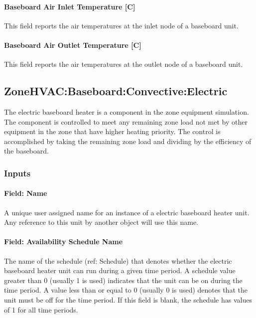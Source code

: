 \paragraph{Baseboard Air Inlet Temperature {[}C{]}}\label{baseboard-air-inlet-temperature-c-1}

This field reports the air temperatures at the inlet node of a baseboard unit.

\paragraph{Baseboard Air Outlet Temperature {[}C{]}}\label{baseboard-air-outlet-temperature-c-1}

This field reports the air temperatures at the outlet node of a baseboard unit.

\subsection{ZoneHVAC:Baseboard:Convective:Electric}\label{zonehvacbaseboardconvectiveelectric}

The electric baseboard heater is a component in the zone equipment simulation. The component is controlled to meet any remaining zone load not met by other equipment in the zone that have higher heating priority. The control is accomplished by taking the remaining zone load and dividing by the efficiency of the baseboard.

\subsubsection{Inputs}\label{inputs-4-025}

\paragraph{Field: Name}\label{field-name-4-022}

A unique user assigned name for an instance of a electric baseboard heater unit. Any reference to this unit by another object will use this name.

\paragraph{Field: Availability Schedule Name}\label{field-availability-schedule-name-4-005}

The name of the schedule (ref: Schedule) that denotes whether the electric baseboard heater unit can run during a given time period. A schedule value greater than 0 (usually 1 is used) indicates that the unit can be on during the time period. A value less than or equal to 0 (usually 0 is used) denotes that the unit must be off for the time period. If this field is blank, the schedule has values of 1 for all time periods.

